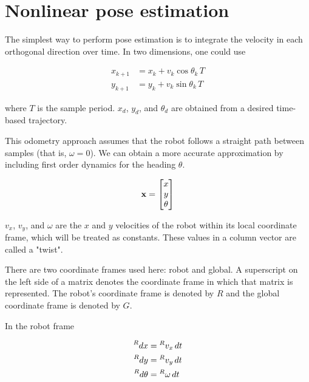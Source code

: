 \section{Nonlinear pose estimation}
\label{sec:nonlinear_pose_estimation}

The simplest way to perform pose estimation is to integrate the velocity in each
orthogonal direction over time. In two dimensions, one could use

\begin{align*}
  x_{k+1} &= x_k + v_k\cos\theta_k\,T \\
  y_{k+1} &= y_k + v_k\sin\theta_k\,T
\end{align*}

where $T$ is the sample period. $x_d$, $y_d$, and $\theta_d$ are obtained from a
desired time-based trajectory.

This odometry approach assumes that the robot follows a straight path between
samples (that is, $\omega = 0$). We can obtain a more accurate approximation by
including first order dynamics for the heading $\theta$.

\begin{equation*}
  \mathbf{x} = \begin{bmatrix}
    x \\
    y \\
    \theta
  \end{bmatrix}
\end{equation*}

$v_x$, $v_y$, and $\omega$ are the $x$ and $y$ velocities of the robot within
its local coordinate frame, which will be treated as constants. These values in
a column vector are called a "twist".

\begin{remark}
  There are two coordinate frames used here: robot and global. A superscript on
  the left side of a matrix denotes the coordinate frame in which that matrix is
  represented. The robot's coordinate frame is denoted by $R$ and the global
  coordinate frame is denoted by $G$.
\end{remark}

In the robot frame

\begin{align*}
  \prescript{R}{}{dx} &= \prescript{R}{}{v_x} \,dt \\
  \prescript{R}{}{dy} &= \prescript{R}{}{v_y} \,dt \\
  \prescript{R}{}{d\theta} &= \prescript{R}{}{\omega} \,dt
\end{align*}

